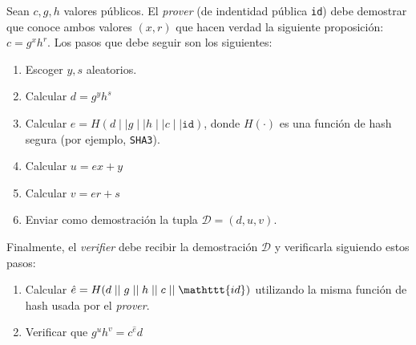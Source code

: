 Sean $c, g, h$ valores públicos. El \emph{prover} (de indentidad pública \texttt{id}) debe demostrar que conoce ambos valores $(x,r)$ que hacen verdad la siguiente proposición: $c = g^x h^r$. Los pasos que debe seguir son los siguientes:
\begin{enumerate}
	\item Escoger $y, s$ aleatorios.
	\item Calcular $d = g^y h^s$
	\item Calcular $e = H(d \mid\mid g \mid\mid h \mid\mid c \mid\mid \mathtt{id})$, donde $H(\cdot)$ es una función de hash segura (por ejemplo, \texttt{SHA3}).
	\item Calcular $u = ex + y$
	\item Calcular $v = er + s$
	\item Enviar como demostración la tupla $\mathcal{D} = (d, u, v)$.
\end{enumerate}

Finalmente, el \emph{verifier} debe recibir la demostración $\mathcal{D}$ y verificarla siguiendo estos pasos:
\begin{enumerate}
	\item Calcular $\hat{e} = H(d \mid\mid g \mid\mid h \mid\mid c \mid\mid \mathttt{id})$ utilizando la misma función de hash usada por el \emph{prover}.
	\item Verificar que $g^u h^v = c^\hat{e} d$
\end{enumerate}
